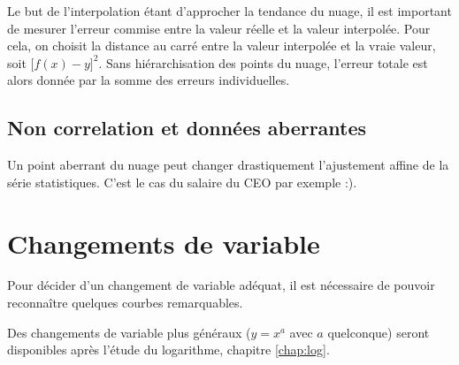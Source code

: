 Le but de l'interpolation étant d'approcher la tendance du nuage, il est important de mesurer l'erreur commise entre la valeur réelle et la valeur interpolée.
Pour cela, on choisit la distance au carré entre la valeur interpolée et la vraie valeur, soit $\bigl[ f(x) - y \bigr]^2$.
Sans hiérarchisation des points du nuage, l'erreur totale est alors donnée par la somme des erreurs individuelles.







\subsection{Non correlation et données aberrantes}



Un point aberrant du nuage peut changer drastiquement l'ajustement affine de la série statistiques.
C'est le cas du salaire du CEO par exemple :).



\section{Changements de variable}

Pour décider d'un changement de variable adéquat, il est nécessaire de pouvoir reconnaître quelques courbes remarquables.



Des changements de variable plus généraux ($y=x^a$ avec $a$ quelconque) seront disponibles après l'étude du logarithme, chapitre \ref{chap:log}.




